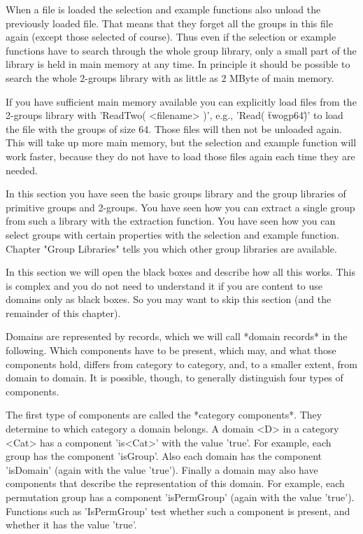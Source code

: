 When a file is loaded the selection and example functions also unload the
previously loaded  file.  That means that  they forget all the groups  in
this file  again (except those selected of  course).   Thus  even if  the
selection or  example  functions  have to search through  the whole group
library, only a  small part of the library is held in  main memory at any
time.   In principle it should  be possible to search the  whole 2-groups
library with as little as 2 MByte of main memory.

If you have  sufficient main memory  available you  can  explicitly  load
files  from the 2-groups  library  with  'ReadTwo(  <filename> )',  e.g.,
'Read( \"twogp64\" )' to load the file with the groups of size 64.  Those
files will  then not  be unloaded again.   This  will take  up  more main
memory, but the  selection and example function will work faster, because
they do not have to load those files again each time they are needed.

In  this section  you have seen  the basic groups library  and  the group
libraries of primitive  groups and 2-groups.  You have seen how  you  can
extract a single group from such a library with the  extraction function.
You  have seen how you can select groups with certain properties with the
selection  and example function.   Chapter  "Group  Libraries"  tells you
which other group libraries are available.

\newpage
{}

In this section we will open the black  boxes  and describe  how all this
works.  This is complex and  you do not need to understand  it if you are
content to use domains only as black boxes.  So you may want to skip this
section (and the remainder of this chapter).

Domains are represented  by records, which we will call *domain  records*
in the following.  Which components have  to  be present,  which may, and
what  those components hold, differs from category to category, and, to a
smaller  extent,  from  domain  to domain.   It  is  possible, though, to
generally distinguish four types of components.

The  first type of components are called the *category components*.  They
determine to which category a domain belongs.  A domain <D> in a category
<Cat> has a component 'is<Cat>' with the value 'true'.  For example, each
group has the  component  'isGroup'.  Also each domain has  the component
'isDomain' (again with the value 'true').  Finally a domain may also have
components that describe the representation of this domain.  For example,
each permutation  group  has  a component  'isPermGroup' (again with  the
value  'true').  Functions such  as  'IsPermGroup'  test  whether such  a
component is present, and whether it has the value 'true'.

